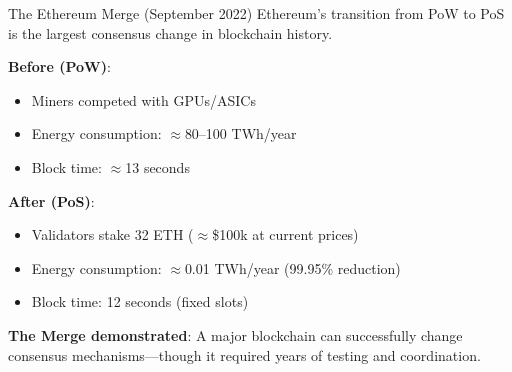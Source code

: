 \documentclass[10pt]{beamer}
\newcommand{\good}[1]{\textcolor{AccentGreen}{#1}}
\begin{document}
\begin{frame}{The Ethereum Merge (September 2022)}
  Ethereum's transition from PoW to PoS is the largest consensus change in blockchain history.
  
  \vspace{1em}
  \textbf{Before (PoW)}:
  \begin{itemize}
    \item Miners competed with GPUs/ASICs
    \item Energy consumption: $\approx$80--100 TWh/year
    \item Block time: $\approx$13 seconds
  \end{itemize}
  
  \vspace{0.5em}
  \textbf{After (PoS)}:
  \begin{itemize}
    \item Validators stake 32 ETH ($\approx$\$100k at current prices)
    \item Energy consumption: \good{$\approx$0.01 TWh/year (99.95\% reduction)}
    \item Block time: 12 seconds (fixed slots)
  \end{itemize}
  
  \vspace{1em}
  \textbf{The Merge demonstrated}: A major blockchain can successfully change consensus mechanisms---though it required years of testing and coordination.
\end{frame}
\end{document}
